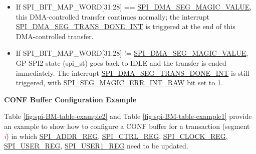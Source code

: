 \documentclass[main\_\_EN.tex]{subfiles}
\begin{document}
    \begin{itemize}
        \item If SPI\_BIT\_MAP\_WORD[31:28] == \hyperref[fielddesc:SPIDMASEGMAGICVALUE]{SPI\_DMA\_SEG\_MAGIC\_VALUE}, this DMA-controlled transfer continues normally; the interrupt \hyperref[int:SPIDMASEGTRANSDONEINT]{SPI\_DMA\_SEG\_TRANS\_DONE\_INT} is triggered at the end of this DMA-controlled transfer.
        \item If SPI\_BIT\_MAP\_WORD[31:28] != \hyperref[fielddesc:SPIDMASEGMAGICVALUE]{SPI\_DMA\_SEG\_MAGIC\_VALUE}, GP-SPI2 state (spi\_st) goes back to IDLE and the transfer is ended immediately. The interrupt \hyperref[int:SPIDMASEGTRANSDONEINT]{SPI\_DMA\_SEG\_TRANS\_DONE\_INT} is still triggered, with \hyperref[fielddesc:SPISEGMAGICERRINTRAW]{SPI\_SEG\_MAGIC\_ERR\_INT\_RAW} bit set to 1.
    \end{itemize}

\textbf{CONF Buffer Configuration Example}\label{sec:gp-spi2-sct-conf-buffer}

Table \ref{fig:spi-BM-table-example2} and Table \ref{fig:spi-BM-table-example1} provide an example to show how to configure a CONF buffer for a transaction (segment \textcolor{red}{\it i}) in which \hyperref[regdesc:SPIADDRREG]{SPI\_ADDR\_REG}, \hyperref[regdesc:SPICTRLREG]{SPI\_CTRL\_REG}, \hyperref[regdesc:SPICLOCKREG]{SPI\_CLOCK\_REG},
\hyperref[regdesc:SPIUSERREG]{SPI\_USER\_REG},
\hyperref[regdesc:SPIUSER1REG]{SPI\_USER1\_REG} need to be updated.
\end{document}
